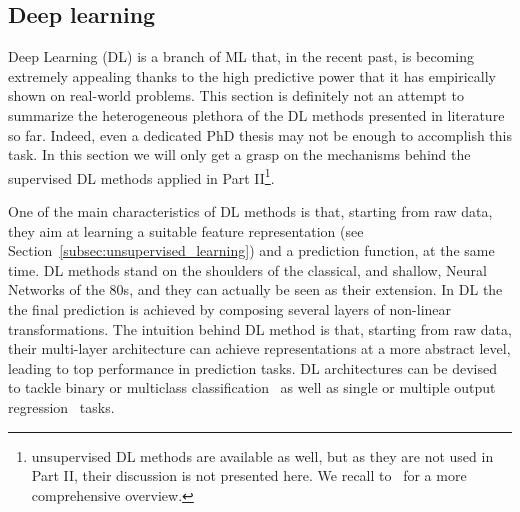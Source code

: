 
	    \subsection{Deep learning}
	    
		Deep Learning (DL) is a branch of ML that, in the recent past, is becoming extremely appealing thanks to the high predictive power that it has empirically shown on real-world problems.
		This section is definitely not an attempt to summarize the heterogeneous plethora of the DL methods presented in literature so far. Indeed, even a dedicated PhD thesis may not be enough to accomplish this task.
		In this section we will only get a grasp on the mechanisms behind the supervised DL methods applied in Part II\footnote{unsupervised DL methods are available as well, but as they are not used in Part II, their discussion is not presented here. We recall to~\cite{lecun2015deep, goodfellow2016deep, chollet2018deep} for a more comprehensive overview.}.
	    
	    One of the main characteristics of DL methods is that, starting from raw data, they aim at learning a suitable feature representation (see Section~\ref{subsec:unsupervised_learning}) and a prediction function, at the same time.
	    DL methods stand on the shoulders of the classical, and shallow, Neural Networks of the $80$s, and they can actually be seen as their extension.
	    In DL the the final prediction is achieved by composing several layers of non-linear transformations.
	    The intuition behind DL method is that, starting from raw data, their multi-layer architecture can achieve representations at a more abstract level, leading to top performance in prediction tasks.
	    DL architectures can be devised to tackle binary or multiclass classification~\cite{angermueller2016deep, leung2014deep} as well as single or multiple output regression~\cite{Chen2016GeneEI, ma2015deep} tasks.

